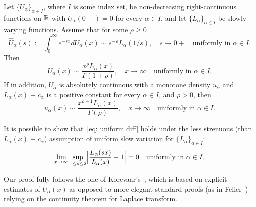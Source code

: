 \documentclass[12pt, reqno]{amsart}
\begin{document}
\begin{theo}
\label{thm: Uniform Tauberian}
Let $\{U_\alpha\}_{\alpha \in I}$, where $I$ is some index set, be non-decreasing right-continuous functions on $\mathbb{R}$ with $U_\alpha(0-)=0$ for every $\alpha \in I$, and let $\{L_\alpha \}_{\alpha \in I}$ be slowly varying functions. Assume that for some $\rho \ge 0$ 
$$\hat{U}_\alpha(s):= \int_{0}^\infty e^{-s x} dU_\alpha(x) \sim  s^{-\rho} L_\alpha(1/s), \quad s \to 0+ \quad \text{uniformly in } \alpha \in I.$$
Then
$$U_\alpha(x) \sim \frac{x^{\rho} L_\alpha(x)}{\Gamma(1 + \rho)}, \quad x \to \infty \quad \text{uniformly in } \alpha \in I.$$ 
If in addition, $U_\alpha$ is absolutely continuous with a monotone density $u_\alpha$ and $L_\alpha(x) \equiv c_\alpha$ is a positive constant for every $\alpha \in I$, and $\rho >0$, 
then
\begin{equation}
\label{eq: uniform diff}
u_\alpha(x) \sim \frac{x^{\rho-1} L_\alpha(x)}{\Gamma(\rho)}, \quad x \to \infty \quad \text{uniformly in } \alpha \in I.
\end{equation}
\end{theo}
\begin{rem*}
It is possible to show that~\eqref{eq: uniform diff} holds under the less strenuous (than $L_\alpha(x) \equiv c_\alpha$) assumption of uniform slow variation for $\{L_\alpha \}_{\alpha \in I}$:
$$\lim_{x \to \infty} \sup_{1 \le s \le 2} \Bigl | \frac{L_\alpha(sx)}{L_\alpha(x)} -1 \Bigr| =0 \quad \text{uniformly in } \alpha \in I.$$
\end{rem*}
Our proof fully follows the one of Korevaar's~\cite[Theorem I.15.3]{Korevaar}, which is based on explicit estimates of $U_\alpha(x)$ as opposed to more elegant standard proofs (as in Feller~\cite[Theorem XIII.5.2]{Feller}) relying on the continuity theorem for  Laplace transform. 
\end{document}
